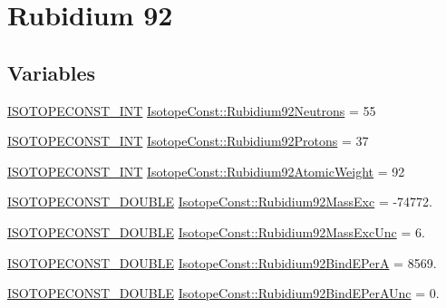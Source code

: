 \hypertarget{group___isotope_const-_rubidium-_rb92}{}\section{Rubidium 92}
\label{group___isotope_const-_rubidium-_rb92}
\subsection*{Variables}
\begin{DoxyCompactItemize}
\item 
\mbox{\hyperlink{group___isotope_const-_macros_ga5f18360b3e99483a35c32d789e62621c}{I\+S\+O\+T\+O\+P\+E\+C\+O\+N\+S\+T\+\_\+\+I\+NT}} \mbox{\hyperlink{group___isotope_const-_rubidium-_rb92_gaff25ebfb165fc05c3a2e2f999e563160}{Isotope\+Const\+::\+Rubidium92\+Neutrons}} = 55
\item 
\mbox{\hyperlink{group___isotope_const-_macros_ga5f18360b3e99483a35c32d789e62621c}{I\+S\+O\+T\+O\+P\+E\+C\+O\+N\+S\+T\+\_\+\+I\+NT}} \mbox{\hyperlink{group___isotope_const-_rubidium-_rb92_ga9c1597546d24384352d4773c0223858e}{Isotope\+Const\+::\+Rubidium92\+Protons}} = 37
\item 
\mbox{\hyperlink{group___isotope_const-_macros_ga5f18360b3e99483a35c32d789e62621c}{I\+S\+O\+T\+O\+P\+E\+C\+O\+N\+S\+T\+\_\+\+I\+NT}} \mbox{\hyperlink{group___isotope_const-_rubidium-_rb92_ga2130b261935b5a3c777ed3bc373b860b}{Isotope\+Const\+::\+Rubidium92\+Atomic\+Weight}} = 92
\item 
\mbox{\hyperlink{group___isotope_const-_macros_ga8f45a7272ce02c0b4c65c44636ed719a}{I\+S\+O\+T\+O\+P\+E\+C\+O\+N\+S\+T\+\_\+\+D\+O\+U\+B\+LE}} \mbox{\hyperlink{group___isotope_const-_rubidium-_rb92_ga0bec041634e197a736355fe0b99a8ef5}{Isotope\+Const\+::\+Rubidium92\+Mass\+Exc}} = -\/74772.
\item 
\mbox{\hyperlink{group___isotope_const-_macros_ga8f45a7272ce02c0b4c65c44636ed719a}{I\+S\+O\+T\+O\+P\+E\+C\+O\+N\+S\+T\+\_\+\+D\+O\+U\+B\+LE}} \mbox{\hyperlink{group___isotope_const-_rubidium-_rb92_ga81946dd254c04b298142f25edcc5d17f}{Isotope\+Const\+::\+Rubidium92\+Mass\+Exc\+Unc}} = 6.
\item 
\mbox{\hyperlink{group___isotope_const-_macros_ga8f45a7272ce02c0b4c65c44636ed719a}{I\+S\+O\+T\+O\+P\+E\+C\+O\+N\+S\+T\+\_\+\+D\+O\+U\+B\+LE}} \mbox{\hyperlink{group___isotope_const-_rubidium-_rb92_ga623173a7fc0ae203a6136dd78e258085}{Isotope\+Const\+::\+Rubidium92\+Bind\+E\+PerA}} = 8569.
\item 
\mbox{\hyperlink{group___isotope_const-_macros_ga8f45a7272ce02c0b4c65c44636ed719a}{I\+S\+O\+T\+O\+P\+E\+C\+O\+N\+S\+T\+\_\+\+D\+O\+U\+B\+LE}} \mbox{\hyperlink{group___isotope_const-_rubidium-_rb92_gab13dbf52e66c918c2361af2af63e00fb}{Isotope\+Const\+::\+Rubidium92\+Bind\+E\+Per\+A\+Unc}} = 0.

\end{DoxyCompactItemize}
